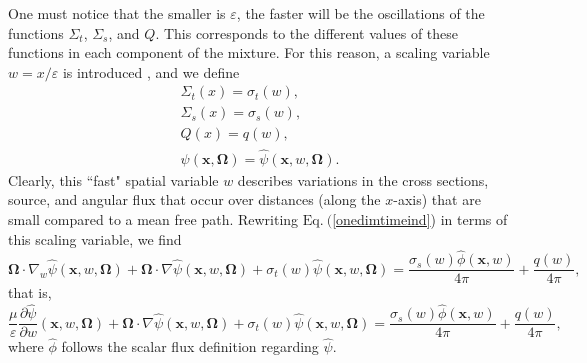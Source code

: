 \documentclass[12pt]{article}
\newcommand{\ep}{\varepsilon}
\newcommand{\n}{ \noindent}
\begin{document}
One must notice that the smaller is $\ep$, the faster will be the oscillations of the functions $\Sigma_t$, $\Sigma_s$, and $Q$.
This corresponds to the different values of these functions in each component of the mixture.
For this reason, a scaling variable $w=x/\ep$ is introduced \cite{dumas_00,larsen_03,larsen_rio}, and we define
\begin{subequations}
\begin{align}\label{scale1}
\Sigma_t(x)=\sigma_t(w),
\\ \label{scale2}
\Sigma_s(x)=\sigma_s(w),
\\ \label{scale3}
Q(x)=q(w),
\\ \label{scale4}
\psi(\bm x,\bm\Omega)=\hat \psi(\bm x,w,\bm\Omega).
\end{align}
\end{subequations}
\n Clearly, this ``fast" spatial variable $w$ describes variations in the cross sections, source, and angular flux that occur over distances (along the $x$-axis) that are small compared to a mean free path.
Rewriting $\textrm{Eq.}\ ($\ref{onedimtimeind}) in terms of this scaling variable, we find
\begin{equation}
\bm\Omega\cdot\nabla_w\hat\psi(\bm x,w,\bm\Omega)+
\bm\Omega\cdot\nabla\hat\psi(\bm x,w,\bm\Omega) + \sigma_t(w)\hat\psi(\bm x,w,\bm\Omega) =
\frac{\sigma_s(w)\hat\phi(\bm x,w)}{4\pi}+\frac{q(w)}{4\pi},
\end{equation}
that is,
\begin{equation}\label{rescaledeq}
\frac{\mu}{\ep}\frac{\partial\hat\psi}{\partial w}(\bm x,w,\bm\Omega)+
\bm\Omega\cdot\nabla\hat\psi(\bm x,w,\bm\Omega) + \sigma_t(w)\hat\psi(\bm x,w,\bm\Omega) =
\frac{\sigma_s(w)\hat\phi(\bm x,w)}{4\pi}+\frac{q(w)}{4\pi},
\end{equation}
where $\hat\phi$ follows the scalar flux definition regarding $\hat\psi$.
\end{document}
